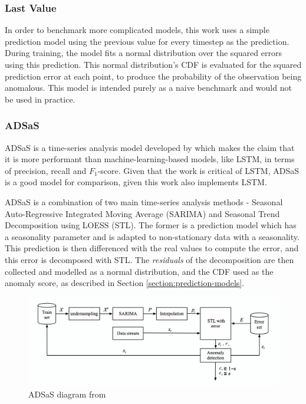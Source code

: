 \documentclass{mpaper}
\begin{document}
\subsubsection{Last Value}

In order to benchmark more complicated models, this work uses a simple prediction model using the previous value for every timestep as the prediction. During training, the model fits a normal distribution over the squared errors using this prediction. This normal distribution's CDF is evaluated for the squared prediction error at each point, to produce the probability of the observation being anomalous. This model is intended purely as a naive benchmark and would not be used in practice.

\subsubsection{ADSaS}

ADSaS is a time-series analysis model developed by \cite{ADSaS} which makes the claim that it is more performant than machine-learning-based models, like LSTM, in terms of precision, recall and $F_1$-score. Given that the work is critical of LSTM, ADSaS is a good model for comparison, given this work also implements LSTM.

ADSaS is a combination of two main time-series analysis methods - Seasonal Auto-Regressive Integrated Moving Average (SARIMA) and Seasonal Trend Decomposition using LOESS (STL). The former is a prediction model which has a seasonality parameter and is adapted to non-stationary data with a seasonality. This prediction is then differenced with the real values to compute the error, and this error is decomposed with STL. The \textit{residuals} of the decomposition are then collected and modelled as a normal distribution, and the CDF used as the anomaly score, as described in Section \ref{section:prediction-models}.

\begin{figure}[h]
	\graphicspath{{img/}}
	\includegraphics[width=\textwidth]{adsas_diagram.png}
	\caption{ADSaS diagram from \cite{ADSaS}}
	\label{fig:adsas-diagram}
\end{figure}
\end{document}
